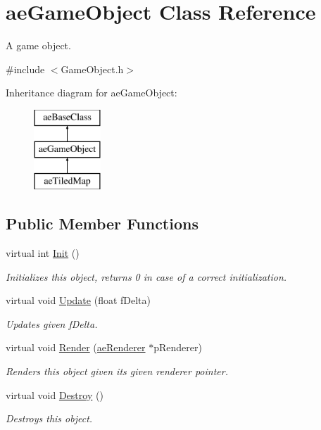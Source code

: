 \hypertarget{classae_game_object}{}\section{ae\+Game\+Object Class Reference}
\label{classae_game_object}


A game object.  




{\ttfamily \#include $<$Game\+Object.\+h$>$}

Inheritance diagram for ae\+Game\+Object\+:\begin{figure}[H]
\begin{center}
\leavevmode
\includegraphics[height=3.000000cm]{classae_game_object}
\end{center}
\end{figure}
\subsection*{Public Member Functions}
\begin{DoxyCompactItemize}
\item 
virtual int \hyperlink{classae_game_object_ab4e04a67ee1f5d7a23966792577534e6}{Init} ()
\begin{DoxyCompactList}\small\item\em Initializes this object, returns 0 in case of a correct initialization. \end{DoxyCompactList}\item 
virtual void \hyperlink{classae_game_object_ab43b31f1179579df835873e60ae84f32}{Update} (float f\+Delta)
\begin{DoxyCompactList}\small\item\em Updates given f\+Delta. \end{DoxyCompactList}\item 
virtual void \hyperlink{classae_game_object_ae2ab1d6a65f6008766faa8295affc9fe}{Render} (\hyperlink{classae_core_1_1ae_renderer}{ae\+Renderer} $\ast$p\+Renderer)
\begin{DoxyCompactList}\small\item\em Renders this object given its given renderer pointer. \end{DoxyCompactList}\item 
virtual void \hyperlink{classae_game_object_af7faadfae20c3d83d521b7e1b4e4b06b}{Destroy} ()\hypertarget{classae_game_object_af7faadfae20c3d83d521b7e1b4e4b06b}{}\label{classae_game_object_af7faadfae20c3d83d521b7e1b4e4b06b}

\begin{DoxyCompactList}\small\item\em Destroys this object. \end{DoxyCompactList}\end{DoxyCompactItemize}
